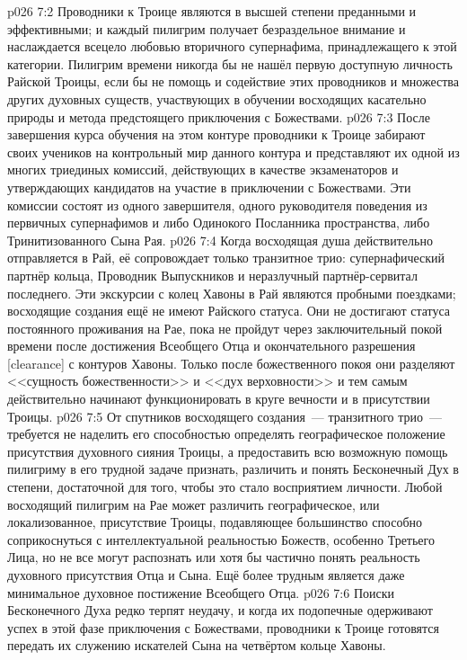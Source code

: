 \vs p026 7:2 Проводники к Троице являются в высшей степени преданными и эффективными; и каждый пилигрим получает безраздельное внимание и наслаждается всецело любовью вторичного супернафима, принадлежащего к этой категории. Пилигрим времени никогда бы не нашёл первую доступную личность Райской Троицы, если бы не помощь и содействие этих проводников и множества других духовных существ, участвующих в обучении восходящих касательно природы и метода предстоящего приключения с Божествами.
\vs p026 7:3 После завершения курса обучения на этом контуре проводники к Троице забирают своих учеников на контрольный мир данного контура и представляют их одной из многих триединых комиссий, действующих в качестве экзаменаторов и утверждающих кандидатов на участие в приключении с Божествами. Эти комиссии состоят из одного завершителя, одного руководителя поведения из первичных супернафимов и либо Одинокого Посланника пространства, либо Тринитизованного Сына Рая.
\vs p026 7:4 Когда восходящая душа действительно отправляется в Рай, её сопровождает только транзитное трио: супернафический партнёр кольца, Проводник Выпускников и неразлучный партнёр\hyp{}сервитал последнего. Эти экскурсии с колец Хавоны в Рай являются пробными поездками; восходящие создания ещё не имеют Райского статуса. Они не достигают статуса постоянного проживания на Рае, пока не пройдут через заключительный покой времени после достижения Всеобщего Отца и окончательного разрешения [clearance] с контуров Хавоны. Только после божественного покоя они разделяют <<сущность божественности>> и <<дух верховности>> и тем самым действительно начинают функционировать в круге вечности и в присутствии Троицы.
\vs p026 7:5 \pc От спутников восходящего создания~--- транзитного трио~--- требуется не наделить его способностью определять географическое положение присутствия духовного сияния Троицы, а предоставить всю возможную помощь пилигриму в его трудной задаче признать, различить и понять Бесконечный Дух в степени, достаточной для того, чтобы это стало восприятием личности. Любой восходящий пилигрим на Рае может различить географическое, или локализованное, присутствие Троицы, подавляющее большинство способно соприкоснуться с интеллектуальной реальностью Божеств, особенно Третьего Лица, но не все могут распознать или хотя бы частично понять реальность духовного присутствия Отца и Сына. Ещё более трудным является даже минимальное духовное постижение Всеобщего Отца.
\vs p026 7:6 Поиски Бесконечного Духа редко терпят неудачу, и когда их подопечные одерживают успех в этой фазе приключения с Божествами, проводники к Троице готовятся передать их служению искателей Сына на четвёртом кольце Хавоны.
